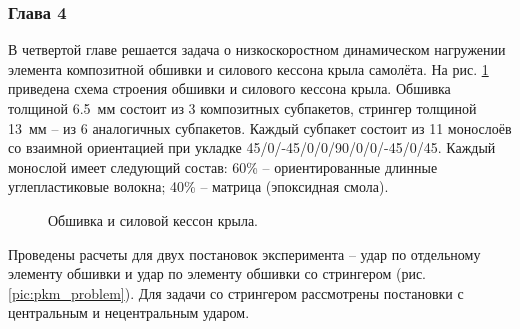 
\subsubsection*{Глава 4}

В четвертой главе решается задача о низкоскоростном динамическом нагружении элемента композитной обшивки и силового кессона крыла самолёта. На рис. \ref{pic:construction} приведена схема строения обшивки и силового кессона крыла. Обшивка толщиной 6.5~мм состоит из 3 композитных субпакетов, стрингер толщиной 13~мм -- из 6 аналогичных субпакетов. Каждый субпакет состоит из 11 монослоёв со взаимной ориентацией при укладке 45/0/-45/0/0/90/0/0/-45/0/45. Каждый монослой имеет следующий состав: 60\% -- ориентированные длинные углепластиковые волокна; 40\% -- матрица (эпоксидная смола). 

\begin{figure}[htp]
\caption{Обшивка и силовой кессон крыла.}
\label{pic:construction}
\end{figure}

Проведены расчеты для двух постановок эксперимента -- удар по отдельному элементу обшивки и удар по элементу обшивки со стрингером (рис. \ref{pic:pkm_problem}). Для задачи со стрингером рассмотрены постановки с центральным и нецентральным ударом.

